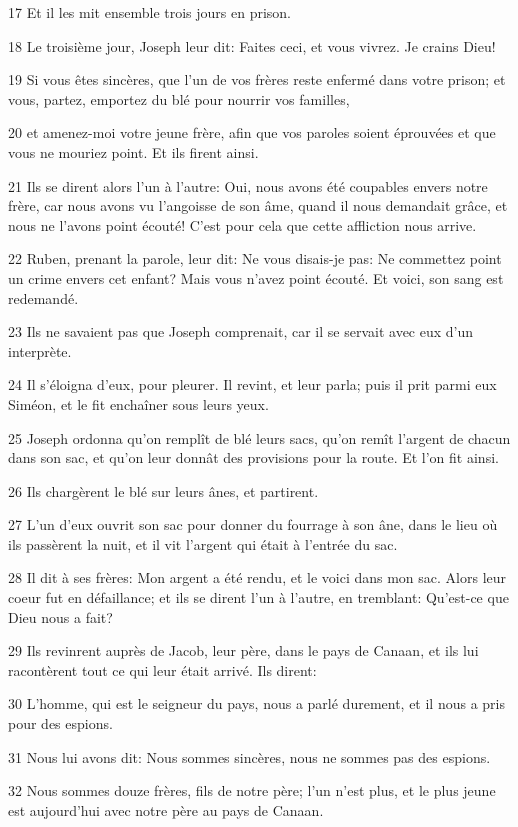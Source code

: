 \par 17 Et il les mit ensemble trois jours en prison.
\par 18 Le troisième jour, Joseph leur dit: Faites ceci, et vous vivrez. Je crains Dieu!
\par 19 Si vous êtes sincères, que l'un de vos frères reste enfermé dans votre prison; et vous, partez, emportez du blé pour nourrir vos familles,
\par 20 et amenez-moi votre jeune frère, afin que vos paroles soient éprouvées et que vous ne mouriez point. Et ils firent ainsi.
\par 21 Ils se dirent alors l'un à l'autre: Oui, nous avons été coupables envers notre frère, car nous avons vu l'angoisse de son âme, quand il nous demandait grâce, et nous ne l'avons point écouté! C'est pour cela que cette affliction nous arrive.
\par 22 Ruben, prenant la parole, leur dit: Ne vous disais-je pas: Ne commettez point un crime envers cet enfant? Mais vous n'avez point écouté. Et voici, son sang est redemandé.
\par 23 Ils ne savaient pas que Joseph comprenait, car il se servait avec eux d'un interprète.
\par 24 Il s'éloigna d'eux, pour pleurer. Il revint, et leur parla; puis il prit parmi eux Siméon, et le fit enchaîner sous leurs yeux.
\par 25 Joseph ordonna qu'on remplît de blé leurs sacs, qu'on remît l'argent de chacun dans son sac, et qu'on leur donnât des provisions pour la route. Et l'on fit ainsi.
\par 26 Ils chargèrent le blé sur leurs ânes, et partirent.
\par 27 L'un d'eux ouvrit son sac pour donner du fourrage à son âne, dans le lieu où ils passèrent la nuit, et il vit l'argent qui était à l'entrée du sac.
\par 28 Il dit à ses frères: Mon argent a été rendu, et le voici dans mon sac. Alors leur coeur fut en défaillance; et ils se dirent l'un à l'autre, en tremblant: Qu'est-ce que Dieu nous a fait?
\par 29 Ils revinrent auprès de Jacob, leur père, dans le pays de Canaan, et ils lui racontèrent tout ce qui leur était arrivé. Ils dirent:
\par 30 L'homme, qui est le seigneur du pays, nous a parlé durement, et il nous a pris pour des espions.
\par 31 Nous lui avons dit: Nous sommes sincères, nous ne sommes pas des espions.
\par 32 Nous sommes douze frères, fils de notre père; l'un n'est plus, et le plus jeune est aujourd'hui avec notre père au pays de Canaan.
